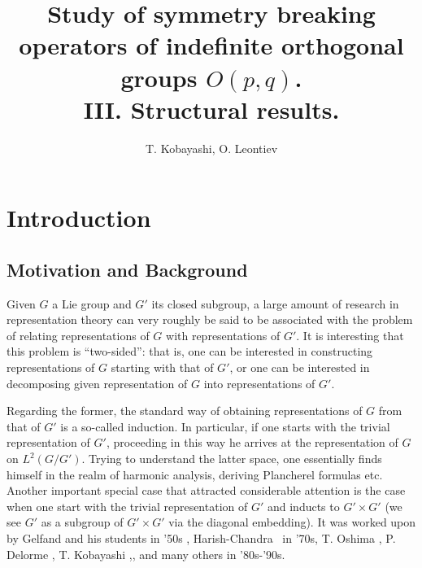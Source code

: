 \documentclass{article}
\numberwithin{definition}{section}
\numberwithin{lemma}{section}
\numberwithin{proposition}{section}
{\theorembodyfont{\rmfamily}\newtheorem{remark}{Remark}
\numberwithin{remark}{section}
}
\begin{document}
\title{Study of symmetry breaking operators of indefinite orthogonal groups $O( p, q)$.\\ 
III. Structural results.}
\author{T. Kobayashi, O. Leontiev}
\maketitle

{\tableofcontents}

\setcounter{section}{18}
\section{Introduction}

\subsection{Motivation and Background}

Given $G$ a Lie group and $G'$ its closed subgroup, a large amount of research
in representation theory can very roughly be said to be associated with the
problem of relating representations of $G$ with representations of $G'$. It is
interesting that this problem is ``two-sided'': that is, one can be interested
in constructing representations of $G$ starting with that of $G'$, or one can
be interested in decomposing given representation of $G$ into representations
of $G'$.

Regarding the former, the standard way of obtaining representations of $G$
from that of $G'$ is a so-called induction. In particular, if one starts with
the trivial representation of $G'$, proceeding in this way he arrives at the
representation of $G$ on $L^2 ( G / G')$. Trying to understand the latter
space, one essentially finds himself in the realm of harmonic analysis,
deriving Plancherel formulas etc. Another important special case that
attracted considerable attention is the case when one start with the trivial
representation of $G'$ and inducts to $G' \times G'$ (we see $G'$ as a
subgroup of $G' \times G'$ via the diagonal embedding). It was worked upon by
Gelfand and his students {\cite{gelfand1966generalized}} in '50s ,
Harish-Chandra {\cite{harishchandra1978harmonic}} \ in '70s, T. Oshima
{\cite{oshima1984description}}, P. Delorme {\cite{delorme1998plancherel}}, T.
Kobayashi
{\cite{kobayashi1994discrete1}},{\cite{kobayashi1998discrete2}},{\cite{kobayashi1998discrete3}}
and many others in '80s-'90s.
\end{document}
